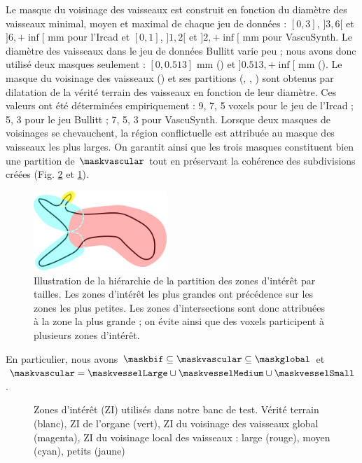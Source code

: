 Le masque du voisinage des vaisseaux est construit en fonction du diamètre des vaisseaux minimal, moyen et maximal de chaque jeu de données : $[0,3]$, $]3,6[$ et $]6,+\inf[$ mm pour l'Ircad et $[0,1]$, $]1,2[$ et $]2,+\inf[$ mm pour VascuSynth. Le diamètre des vaisseaux dans le jeu de données Bullitt varie peu ; nous avons donc utilisé deux masques seulement : $[0,0.513]$ mm (\maskvesselSmall) et $]0.513,+\inf[$ mm (\maskvesselMedium). Le masque du voisinage des vaisseaux (\maskvessel) et ses partitions (\maskvesselLarge, \maskvesselMedium, \maskvesselSmall) sont obtenus par dilatation de la vérité terrain des vaisseaux en fonction de leur diamètre. Ces valeurs ont été déterminées empiriquement : 9, 7, 5 voxels pour le jeu de l'Ircad ; 5, 3 pour le jeu Bullitt ; 7, 5, 3 pour VascuSynth. Lorsque deux masques de voisinages se chevauchent, la région conflictuelle est attribuée au masque des vaisseaux les plus larges. On garantit ainsi que les trois masques constituent bien une partition de $\maskvascular$ tout en préservant la cohérence des subdivisions créées (Fig. \ref{fig:vs_masks} et \ref{fig:numibranch}).
\begin{figure}[!ht]
  \centering
  \includegraphics[height=3cm]{Images/numibranch.png}
  \caption{Illustration de la hiérarchie de la partition des zones d'intérêt par tailles. Les zones d'intérêt les plus grandes ont précédence sur les zones les plus petites. Les zones d'intersections sont donc attribuées à la zone la plus grande ; on évite ainsi que des voxels participent à plusieurs zones d'intérêt.}
  \label{fig:numibranch}
\end{figure}
En particulier, nous avons $\maskbif \subseteq \maskvascular \subseteq \maskglobal$ et $\maskvascular = \maskvesselLarge \cup \maskvesselMedium \cup \maskvesselSmall$.
\begin{figure}[!ht]
  \centering
  \caption{Zones d'intérêt (ZI) utilisés dans notre banc de test. Vérité terrain (blanc), ZI de l'organe (vert), ZI du voisinage des vaisseaux global (magenta), ZI du voisinage local des vaisseaux : large (rouge), moyen (cyan), petits (jaune)}
  \label{fig:vs_masks}
\end{figure}
